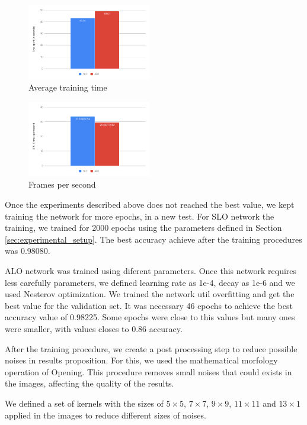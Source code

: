 \begin{figure}
  \centering
  \includegraphics[width=0.48\textwidth]{figures/train_time.png}
  \caption{Average training time}
  \label{fig:train_time}
\end{figure}

\begin{figure}
  \centering
  \includegraphics[width=0.48\textwidth]{figures/fps.png}
  \caption{Frames per second}
  \label{fig:fps}
\end{figure}

Once the experiments described above does not reached the best value, we kept training the network for more epochs, in a new test. For SLO network the training, we trained for 2000 epochs using the parameters defined in Section \ref{sec:experimental_setup}. The best accuracy achieve after the training procedures was 0.98080.

ALO network was trained using diferent parameters. Once this network requires less carefully parameters, we defined learning rate as 1e-4, decay as 1e-6 and we used Nesterov optimization. We trained the network util overfitting and get the best value for the validation set. It was necessary 46 epochs to achieve the best accuracy value of 0.98225. Some epochs were close to this values but many ones were smaller, with values closes to 0.86 accuracy.

After the training procedure, we create a post processing step to reduce possible noises in results proposition. For this, we used the mathematical morfology operation of Opening. This procedure removes small noises that could exists in the images, affecting the quality of the results.

We defined a set of kernels with the sizes of $5 \times 5$, $7 \times 7$, $9 \times 9$, $11 \times 11$ and $13 \times 1$ applied in the images to reduce different sizes of noises.

